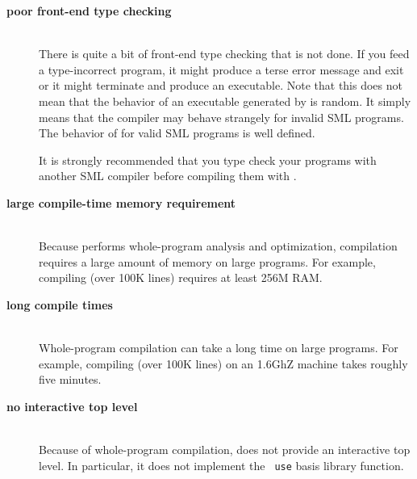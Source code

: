 
\newcommand{\drawback}[1]{\item[\bf #1]\hspace{1in}\\}

\begin{description}

\drawback{poor front-end type checking}
There is quite a bit of front-end type checking that is not done.  If
you feed {\mlton} a type-incorrect program, it might produce a terse
error message and exit or it might terminate and produce an
executable.  Note that this does not mean that the behavior of an
executable generated by {\mlton} is random.  It simply means that the
compiler may behave strangely for invalid SML programs.  The behavior
of {\mlton} for valid SML programs is well defined.

It is strongly recommended that you type check your programs with
another SML compiler before compiling them with {\mlton}.

\drawback{large compile-time memory requirement}
Because {\mlton} performs whole-program analysis and optimization,
compilation requires a large amount of memory on large programs.  For
example, compiling {\mlton} (over 100K lines) requires at least 256M
RAM.

\drawback{long compile times}
Whole-program compilation can take a long time on large programs.  For
example, compiling {\mlton} (over 100K lines) on an 1.6GhZ machine
takes roughly five minutes.

\drawback{no interactive top level}
Because of whole-program compilation, {\mlton} does not provide an
interactive top level.  In particular, it does not implement the {\tt
use} basis library function.

\end{description}
